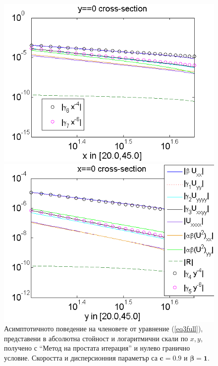\documentclass{article}
\newcommand{\rf}[1]{(\ref{#1})}
\theoremstyle{remark}
\begin{document}
\begin{figure}[ht]	
	\begin{minipage}[b]{0.95\linewidth}
		\raggedleft
		\includegraphics[width=\linewidth]{AssymptForEachTerm/bt1_c010_090/ChristovIC_AlongX_50_ZB2_bt1_c090_h020_O(h^6).png}
	\end{minipage}
	\begin{minipage}[b]{0.95\linewidth}
		 \raggedright
		\includegraphics[width=\linewidth]{AssymptForEachTerm/bt1_c010_090/ChristovIC_AlongY_50_ZB2_bt1_c090_h020_O(h^6).png}
	\end{minipage}
	\caption{Асимптотичното поведение на членовете от уравнение \rf{eq3full}, представени в абсолютна стойност и логаритмични скали по $x,y$, получено с ``Метод на простата итерация'' и нулево гранично условие. Скоростта и дисперсионния параметър са $\boldsymbol{c=0.9}$ и $\boldsymbol{\beta = 1}$. }
	\label{fig:assympt_beta1c09}
\end{figure}
\FloatBarrier
\end{document}
